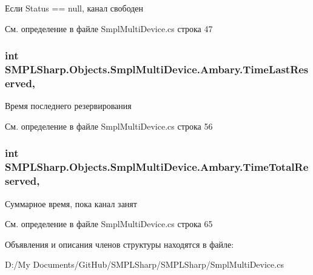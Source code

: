 Если Status == null, канал свободен 



См. определение в файле Smpl\-Multi\-Device.\-cs строка 47

\hypertarget{struct_s_m_p_l_sharp_1_1_objects_1_1_smpl_multi_device_1_1_ambary_af51ba6a3079bd09a71f4cc797beb9e6a}{
\subsubsection[{Time\-Last\-Reserved}]{\setlength{\rightskip}{0pt plus 5cm}int S\-M\-P\-L\-Sharp.\-Objects.\-Smpl\-Multi\-Device.\-Ambary.\-Time\-Last\-Reserved\hspace{0.3cm}{\ttfamily [get]}, {\ttfamily [set]}}}\label{d1/df4/struct_s_m_p_l_sharp_1_1_objects_1_1_smpl_multi_device_1_1_ambary_af51ba6a3079bd09a71f4cc797beb9e6a}


Время последнего резервирования 



См. определение в файле Smpl\-Multi\-Device.\-cs строка 56

\hypertarget{struct_s_m_p_l_sharp_1_1_objects_1_1_smpl_multi_device_1_1_ambary_a8f8b20fb74105cecd5af51513d5b7826}{
\subsubsection[{Time\-Total\-Reserved}]{\setlength{\rightskip}{0pt plus 5cm}int S\-M\-P\-L\-Sharp.\-Objects.\-Smpl\-Multi\-Device.\-Ambary.\-Time\-Total\-Reserved\hspace{0.3cm}{\ttfamily [get]}, {\ttfamily [set]}}}\label{d1/df4/struct_s_m_p_l_sharp_1_1_objects_1_1_smpl_multi_device_1_1_ambary_a8f8b20fb74105cecd5af51513d5b7826}


Суммарное время, пока канал занят 



См. определение в файле Smpl\-Multi\-Device.\-cs строка 65



Объявления и описания членов структуры находятся в файле\-:\begin{DoxyCompactItemize}
\item 
D\-:/\-My Documents/\-Git\-Hub/\-S\-M\-P\-L\-Sharp/\-S\-M\-P\-L\-Sharp/Smpl\-Multi\-Device.\-cs\end{DoxyCompactItemize}
